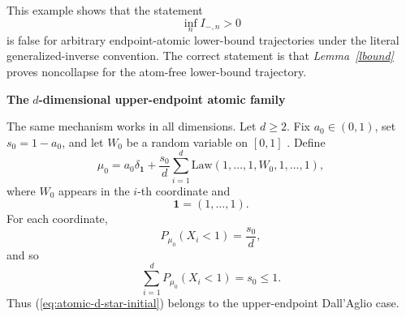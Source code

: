 \documentclass[onecolumn]{article}
\begin{document}
This example shows that the statement 
\begin{equation*}
\inf_{n}I_{-,n}>0
\end{equation*}%
is false for arbitrary endpoint-atomic lower-bound trajectories under the
literal generalized-inverse convention. The correct statement is that 
\textit{Lemma~\ref{lbound}} proves noncollapse for the atom-free lower-bound
trajectory.

\begin{flushleft}
\textbf{The }$d$\textbf{-dimensional upper-endpoint atomic family}
\end{flushleft}

The same mechanism works in all dimensions. Let $d\geq 2$. Fix $a_{0}\in
(0,1)$, set $s_{0}=1-a_{0}$, and let $W_{0}$ be a random variable on $[0,1]$%
. Define 
\begin{equation}
\mu _{0}=a_{0}\delta _{\mathbf{1}}+\frac{s_{0}}{d}\sum_{i=1}^{d}\mathrm{Law}%
(1,\ldots ,1,W_{0},1,\ldots ,1),  \label{eq:atomic-d-star-initial}
\end{equation}%
where $W_{0}$ appears in the $i$-th coordinate and 
\begin{equation*}
\mathbf{1}=(1,\ldots ,1).
\end{equation*}%
For each coordinate, 
\begin{equation*}
P_{\mu _{0}}(X_{i}<1)=\frac{s_{0}}{d},
\end{equation*}%
and so 
\begin{equation*}
\sum_{i=1}^{d}P_{\mu _{0}}(X_{i}<1)=s_{0}\leq 1.
\end{equation*}%
Thus (\ref{eq:atomic-d-star-initial}) belongs to the upper-endpoint
Dall'Aglio case.
\end{document}
